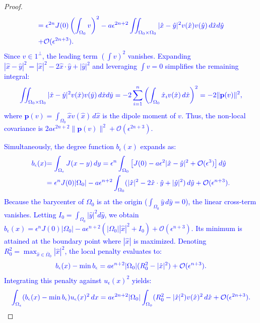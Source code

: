 \documentclass[12pt, a4paper]{article}
\newcommand{\revision}[1]{\textcolor{blue}{#1}}
\theoremstyle{break}
\theoremstyle{break}
\theoremstyle{break}
\theoremstyle{break}
\theoremstyle{break}
\theoremstyle{break}
\theoremstyle{break}
\theoremstyle{break}
\theoremstyle{break}
\begin{document}
\begin{proof}
\begin{align}
        &\revision{= \epsilon^{2n} J(0) \left( \int_{\Omega_0} v \right)^2 - a\epsilon^{2n+2} \iint_{\Omega_0 \times \Omega_0} |\hat{x}-\hat{y}|^2 v(\hat{x})v(\hat{y}) \,d\hat{x} d\hat{y}} \\
        &\revision{+ \mathcal{O}(\epsilon^{2n+3}).}
    \end{align}
    \revision{Since $v \in 1^\perp$, the leading term $\left( \int v \right)^2$ vanishes. Expanding $|\hat{x}-\hat{y}|^2 = |\hat{x}|^2 - 2\hat{x}\cdot \hat{y} + |\hat{y}|^2$ and leveraging $\int v = 0$ simplifies the remaining integral:}
    \begin{equation}
        \revision{\iint_{\Omega_0 \times \Omega_0} |\hat{x}-\hat{y}|^2 v(\hat{x})v(\hat{y}) \,d\hat{x} d\hat{y} = -2 \sum_{i=1}^n \left( \int_{\Omega_0} \hat{x}_i v(\hat{x}) \,d\hat{x} \right)^2 = -2 \| \mathbf{p}(v) \|^2,}
    \end{equation}
    \revision{where $\mathbf{p}(v) = \int_{\Omega_0} \hat{x} v(\hat{x}) \,d\hat{x}$ is the dipole moment of $v$. Thus, the non-local covariance is $2a\epsilon^{2n+2} \| \mathbf{p}(v) \|^2 + \mathcal{O}(\epsilon^{2n+3})$.}
    
    \revision{Simultaneously, the degree function $b_\epsilon(x)$ expands as:}
    \begin{align}
        \revision{b_\epsilon(x)} &\revision{= \int_{\Omega_\epsilon} J(x-y) \,dy = \epsilon^n \int_{\Omega_0} \left[ J(0) - a\epsilon^2 |\hat{x}-\hat{y}|^2 + \mathcal{O}(\epsilon^3) \right] d\hat{y}} \\
        &\revision{= \epsilon^n J(0)|\Omega_0| - a\epsilon^{n+2} \int_{\Omega_0} (|\hat{x}|^2 - 2\hat{x}\cdot \hat{y} + |\hat{y}|^2) \,d\hat{y} + \mathcal{O}(\epsilon^{n+3}).}
    \end{align}
    \revision{Because the barycenter of $\Omega_0$ is at the origin ($\int_{\Omega_0} \hat{y} \,d\hat{y} = 0$), the linear cross-term vanishes. Letting $I_0 = \int_{\Omega_0} |\hat{y}|^2 d\hat{y}$, we obtain $b_\epsilon(x) = \epsilon^n J(0)|\Omega_0| - a\epsilon^{n+2}(|\Omega_0| |\hat{x}|^2 + I_0) + \mathcal{O}(\epsilon^{n+3})$. Its minimum is attained at the boundary point where $|\hat{x}|$ is maximized. Denoting $R_0^2 = \max_{\hat{x} \in \overline{\Omega}_0} |\hat{x}|^2$, the local penalty evaluates to:}
    \begin{equation}
        \revision{b_\epsilon(x) - \min b_\epsilon = a\epsilon^{n+2} |\Omega_0| (R_0^2 - |\hat{x}|^2) + \mathcal{O}(\epsilon^{n+3}).}
    \end{equation}
    \revision{Integrating this penalty against $u_\epsilon(x)^2$ yields:}
    \begin{equation}
        \revision{\int_{\Omega_\epsilon} (b_\epsilon(x) - \min b_\epsilon) u_\epsilon(x)^2 \,dx = a\epsilon^{2n+2} |\Omega_0| \int_{\Omega_0} (R_0^2 - |\hat{x}|^2) v(\hat{x})^2 \,d\hat{x} + \mathcal{O}(\epsilon^{2n+3}).}
    \end{equation}
    

\end{proof}
\end{document}
